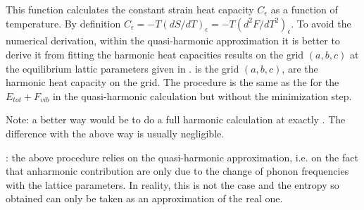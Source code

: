 \documentclass[letterpaper,10pt,english]{sphinxmanual}
\begin{document}
\begin{fulllineitems}
\label{pyqha:pyqha.properties_anis.compute_Ceps}
This function calculates the constant strain heat capacity \(C_{\epsilon}\)
as a function of temperature. 
By definition \(C_{\epsilon} = -T(dS/dT)_{\epsilon}=-T(d^2F/dT^2)_{\epsilon}\). 
To avoid the numerical derivation, within the quasi-harmonic
approximation it is better to derive it from fitting the harmonic heat capacities
results on the grid \((a,b,c)\) at the equilibrium lattic parameters given
in .  is the grid \((a,b,c)\),  are the harmonic 
heat capacity on the grid.
The procedure is the same as the for the \(E_{tot}+F_{vib}\) in the quasi-harmonic
calculation but without the minimization step.

Note: a better way would be to do a full harmonic calculation at exactly .
The difference with the above way is usually negligible.

: the above procedure relies on the quasi-harmonic approximation,
i.e. on the fact that anharmonic contribution are only due to the change of
phonon frequencies with the lattice parameters. In reality, this is not the 
case and the entropy so obtained can only be taken as an approximation of the
real one.

\end{fulllineitems}

\end{document}
